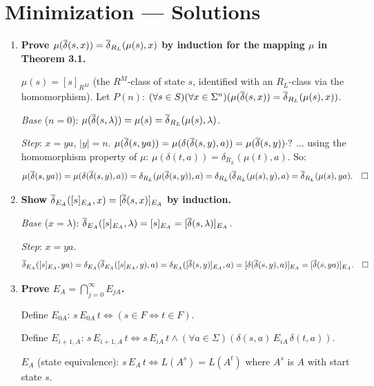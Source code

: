 \chapter{Minimization --- Solutions}

\begin{enumerate}[{3.}1.]

\item \textbf{Prove $\mu(\overline{\delta}(s,x))=\overline{\delta}_{R_L}(\mu(s),x)$ by induction for the mapping $\mu$ in Theorem 3.1.}

$\mu(s)=[s]_{R^M}$ (the $R^M$-class of state $s$, identified with an $R_L$-class via the homomorphism). Let $P(n)$: $(\forall s\in S)(\forall x\in\Sigma^n)(\mu(\overline{\delta}(s,x))=\overline{\delta}_{R_L}(\mu(s),x))$.

\textit{Base} ($n=0$): $\mu(\overline{\delta}(s,\lambda))=\mu(s)=\overline{\delta}_{R_L}(\mu(s),\lambda)$. \checkmark

\textit{Step}: $x=ya$, $|y|=n$. $\mu(\overline{\delta}(s,ya))=\mu(\delta(\overline{\delta}(s,y),a))=\mu(\overline{\delta}(s,y))\cdot?$ ... using the homomorphism property of $\mu$: $\mu(\delta(t,a))=\delta_{R_L}(\mu(t),a)$. So:
\[
\mu(\overline{\delta}(s,ya))=\mu(\delta(\overline{\delta}(s,y),a))=\delta_{R_L}(\mu(\overline{\delta}(s,y)),a)=\delta_{R_L}(\overline{\delta}_{R_L}(\mu(s),y),a)=\overline{\delta}_{R_L}(\mu(s),ya). \quad\square
\]

\item \textbf{Show $\overline{\delta}_{E_A}([s]_{E_A},x)=[\overline{\delta}(s,x)]_{E_A}$ by induction.}

\textit{Base} ($x=\lambda$): $\overline{\delta}_{E_A}([s]_{E_A},\lambda)=[s]_{E_A}=[\overline{\delta}(s,\lambda)]_{E_A}$. \checkmark

\textit{Step}: $x=ya$.
\[
\overline{\delta}_{E_A}([s]_{E_A},ya)=\delta_{E_A}(\overline{\delta}_{E_A}([s]_{E_A},y),a)=\delta_{E_A}([\overline{\delta}(s,y)]_{E_A},a)=[\delta(\overline{\delta}(s,y),a)]_{E_A}=[\overline{\delta}(s,ya)]_{E_A}. \quad\square
\]

\item \textbf{Prove $E_A=\bigcap_{j=0}^\infty E_{jA}$.}

Define $E_{0A}$: $s\,E_{0A}\,t\Leftrightarrow(s\in F\Leftrightarrow t\in F)$.

Define $E_{i+1,A}$: $s\,E_{i+1,A}\,t\Leftrightarrow s\,E_{iA}\,t\wedge(\forall a\in\Sigma)(\delta(s,a)\,E_{iA}\,\delta(t,a))$.

$E_A$ (state equivalence): $s\,E_A\,t\Leftrightarrow L(A^s)=L(A^t)$ where $A^s$ is $A$ with start state $s$.


\end{enumerate}
